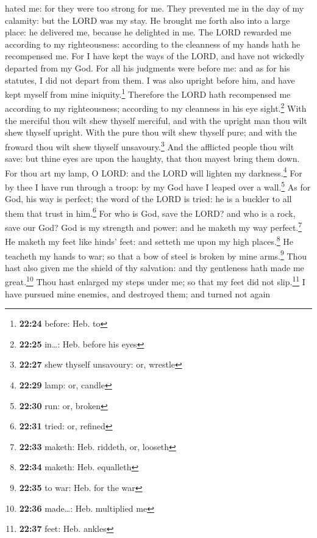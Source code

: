 hated me: for they were too strong for me.  They
prevented me in the day of my calamity: but the LORD was my stay.
 He brought me forth also into a large place: he
delivered me, because he delighted in me.  The LORD
rewarded me according to my righteousness: according to the cleanness of
my hands hath he recompensed me.  For I have kept the
ways of the LORD, and have not wickedly departed from my God.
 For all his judgments were before me: and as for his
statutes, I did not depart from them.  I was also upright
before him, and have kept myself from mine iniquity.\footnote{\textbf{22:24}
  before: Heb. to}  Therefore the LORD hath recompensed
me according to my righteousness; according to my cleanness in his eye
sight.\footnote{\textbf{22:25} in\ldots: Heb. before his eyes}
 With the merciful thou wilt shew thyself merciful, and
with the upright man thou wilt shew thyself upright. 
With the pure thou wilt shew thyself pure; and with the froward thou
wilt shew thyself unsavoury.\footnote{\textbf{22:27} shew thyself
  unsavoury: or, wrestle}  And the afflicted people thou
wilt save: but thine eyes are upon the haughty, that thou mayest bring
them down.  For thou art my lamp, O LORD: and the LORD
will lighten my darkness.\footnote{\textbf{22:29} lamp: or, candle}
 For by thee I have run through a troop: by my God have I
leaped over a wall.\footnote{\textbf{22:30} run: or, broken}
 As for God, his way is perfect; the word of the LORD is
tried: he is a buckler to all them that trust in him.\footnote{\textbf{22:31}
  tried: or, refined}  For who is God, save the LORD? and
who is a rock, save our God?  God is my strength and
power: and he maketh my way perfect.\footnote{\textbf{22:33} maketh:
  Heb. riddeth, or, looseth}  He maketh my feet like
hinds' feet: and setteth me upon my high places.\footnote{\textbf{22:34}
  maketh: Heb. equalleth}  He teacheth my hands to war;
so that a bow of steel is broken by mine arms.\footnote{\textbf{22:35}
  to war: Heb. for the war}  Thou hast also given me the
shield of thy salvation: and thy gentleness hath made me
great.\footnote{\textbf{22:36} made\ldots: Heb. multiplied me}
 Thou hast enlarged my steps under me; so that my feet
did not slip.\footnote{\textbf{22:37} feet: Heb. ankles} 
I have pursued mine enemies, and destroyed them; and turned not again
